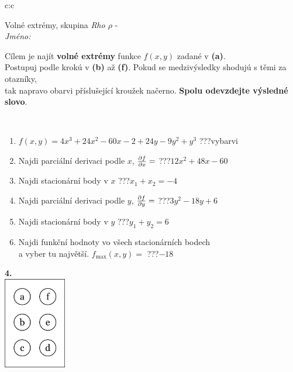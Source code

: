 \documentclass[10pt]{report}
\begin{document}
\begin{tabular}{c:c}
\begin{minipage}[c][104.5mm][t]{0.5\linewidth}
\begin{center}
\vspace{7mm}
{\huge Volné extrémy, skupina \textit{Rho $\rho$} -}\\[5mm]
\textit{Jméno:}\phantom{xxxxxxxxxxxxxxxxxxxxxxxxxxxxxxxxxxxxxxxxxxxxxxxxxxxxxxxxxxxxxxxxx}\\[5mm]
\begin{minipage}{0.95\linewidth}
\begin{center}
Cílem je najít \textbf{volné extrémy} funkce $f(x,y)$ zadané v \textbf{(a)}.\\Postupuj podle krokú v \textbf{(b)} až \textbf{(f)}. Pokud se medzivýsledky shodujú s těmi za otazníky,\\tak napravo obarvi příslušející kroužek načerno. \textbf{Spolu odevzdejte výsledné slovo}.
\end{center}
\end{minipage}
\\[1mm]
\begin{minipage}{0.79\linewidth}
\begin{center}
\begin{varwidth}{\linewidth}
\begin{enumerate}
\normalsize
\item $f(x,y)=4x^3+24x^2-60x-2+24y-9y^2+y^3$\quad \dotfill\; ???\;\dotfill \quad vybarvi
\item Najdi parciální derivaci podle $x$, $\pdv{f}{x}=$\quad \dotfill\; ???\;\dotfill \quad $12x^2+48x-60$
\item Najdi stacionární body v $x$\quad \dotfill\; ???\;\dotfill \quad $x_1+x_2=-4$
\item Najdi parciální derivaci podle $y$, $\pdv{f}{y}=$\quad \dotfill\; ???\;\dotfill \quad $3y^2-18y+6$
\item Najdi stacionární body v $y$\quad \dotfill\; ???\;\dotfill \quad $y_1+y_2=6$
\item Najdi funkční hodnoty vo všech stacionárních bodech \\ \phantom{xxxxxx} a vyber tu najvětší. $f_{\text{max}}(x,y)=$\quad \dotfill\; ???\;\dotfill \quad $-18$
\end{enumerate}
\end{varwidth}
\end{center}
\end{minipage}
\begin{minipage}{0.20\linewidth}
\begin{center}
{\Huge\bfseries 4.} \\[2mm]
\includegraphics[height=40mm]{../images/braille.png}

\end{center}
\end{minipage}
\end{center}
\end{minipage}
\end{tabular}
\end{document}

